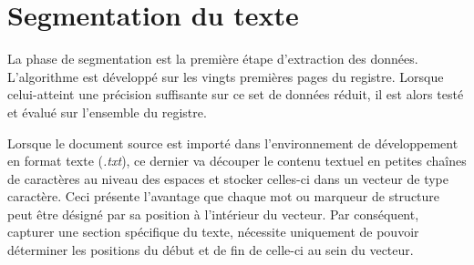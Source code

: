 \section{Segmentation du texte}
La phase de segmentation  est la première étape d'extraction des données.
L'algorithme est développé sur les vingts premières pages du registre. Lorsque celui-atteint une précision suffisante sur ce set de données réduit, il est alors testé et évalué sur l'ensemble du registre.

Lorsque le document source est importé dans l'environnement de développement en format texte (\textit{.txt}), ce dernier va découper le contenu textuel en petites chaînes de caractères au niveau des espaces et stocker celles-ci dans un vecteur de type caractère. Ceci présente l'avantage que chaque mot ou marqueur de structure peut être désigné par sa position à l'intérieur du vecteur. Par conséquent, capturer une section spécifique du texte, nécessite uniquement de pouvoir déterminer les positions du début et de fin de celle-ci au sein du vecteur.  


